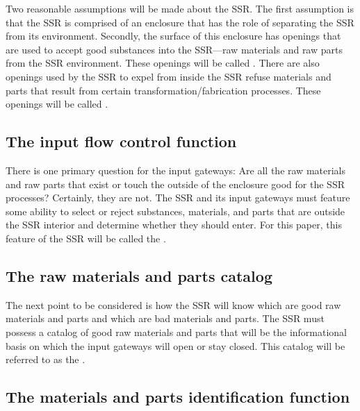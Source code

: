 Two reasonable assumptions will be made about the SSR. The first assumption is
that the SSR is
comprised of an enclosure that has the role of separating the SSR from its
environment. Secondly, the surface of this enclosure has
openings that are used to accept good
substances into the SSR---raw materials and raw parts from the SSR environment. 
These openings will be called . There are also
openings used by the SSR to expel from inside the SSR refuse materials
and parts that result from certain transformation/fabrication processes.
These openings will be called .

\subsection[The input flow control function]{The input flow control
function}

There is one primary question
for the input gateways: Are all the raw materials and raw parts that
exist or touch the outside of the enclosure good for the SSR processes?
Certainly, they are not. The SSR and its input gateways must feature some
ability to select or reject substances, materials,
and parts that are outside the SSR interior and determine whether they should enter. 
For this paper, this feature of the SSR will be called the .

\subsection[The raw materials and parts catalog]{The raw materials and
parts catalog}

The next point to be considered
is how the SSR will know which are good raw materials and parts
and which are bad materials and parts. The SSR must
possess a catalog of good raw materials and parts that will be the
informational basis on which the input gateways will open or stay
closed. This catalog will be referred to as the .

\subsection[The materials and parts identification function]{The
materials and parts identification function}

